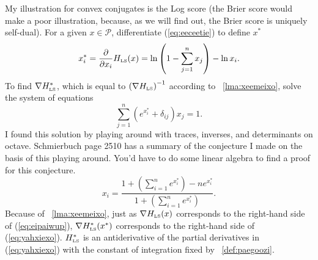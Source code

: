 \documentclass[12pt]{article}
\begin{document}
My illustration for convex conjugates is the Log score (the Brier
score would make a poor illustration, because, as we will find out,
the Brier score is uniquely self-dual). For a given $x\in\mathcal{P}$,
differentiate (\ref{eq:eeceetie}) to define $x^{\ast}$
\begin{equation}
  \label{eq:eipaiwup}
  x^{\ast}_{i}=\frac{\partial}{\partial{}x_{i}}H_{\mbox{\tiny LS}}(x)=\ln\left(1-\sum_{j=1}^{n}x_{j}\right)-\ln{}x_{i}.
\end{equation}
To find $\nabla{}H_{\mbox{\tiny LS}}^{\ast}$, which is equal to
$\left(\nabla{}H_{\mbox{\tiny LS}}\right)^{-1}$ according to {\emma}~\ref{lma:xeemeixo},
solve the system of equations
\begin{equation}
  \label{eq:jahngohr}
  \sum_{j=1}^{n}\left(e^{x^{\ast}_{i}}+\delta_{ij}\right)x_{j}=1.
\end{equation}
I found this solution by playing around with traces, inverses, and
determinants on octave. Schmierbuch page 2510 has a summary of the
conjecture I made on the basis of this playing around. You'd have to
do some linear algebra to find a proof for this conjecture.
\begin{equation}
  \label{eq:yahxiexo}
  x_{i}=\frac{1+\left(\sum_{i=1}^{n}e^{x^{\ast}_{i}}\right)-ne^{x^{\ast}_{i}}}{1+\left(\sum_{i=1}^{n}e^{x^{\ast}_{i}}\right)}.
\end{equation}
Because of {\emma}~\ref{lma:xeemeixo}, just as
$\nabla{}H_{\mbox{\tiny LS}}(x)$ corresponds to the right-hand side of
(\ref{eq:eipaiwup}), $\nabla{}H_{\mbox{\tiny LS}}^{\ast}(x^{\ast})$
corresponds to the right-hand side of (\ref{eq:yahxiexo}).
$H_{\mbox{\tiny LS}}^{\ast}$ is an antiderivative of the partial
derivatives in (\ref{eq:yahxiexo}) with the constant of integration
fixed by {\efinition}~\ref{def:paegoozi}.
\end{document}

